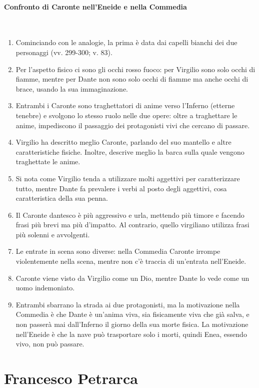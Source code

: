 \documentclass{article}
\begin{document}
\paragraph{Confronto di Caronte nell'Eneide e nella Commedia} \phantom{}\\
\begin{enumerate}
    \item Cominciando con le analogie, la prima è data dai capelli bianchi dei due personaggi (vv. 299-300; v. 83).
    \item Per l'aspetto fisico ci sono gli occhi rosso fuoco: per Virgilio sono solo occhi di fiamme, mentre per Dante non sono solo occhi di fiamme ma anche occhi di brace, usando la sua immaginazione.
    \item Entrambi i Caronte sono traghettatori di anime verso l'Inferno (etterne tenebre) e svolgono lo stesso ruolo nelle due opere: oltre a traghettare le anime, impediscono il passaggio dei protagonisti vivi che cercano di passare.
    \item Virgilio ha descritto meglio Caronte, parlando del suo mantello e altre caratteristiche fisiche. Inoltre, descrive meglio la barca sulla quale vengono traghettate le anime.
    \item Si nota come Virgilio tenda a utilizzare molti aggettivi per caratterizzare tutto, mentre Dante fa prevalere i verbi al posto degli aggettivi, cosa caratteristica della sua penna.
    \item Il Caronte dantesco è più aggressivo e urla, mettendo più timore e facendo frasi più brevi ma più d'impatto. Al contrario, quello virgiliano utilizza frasi più solenni e avvolgenti.
    \item Le entrate in scena sono diverse: nella Commedia Caronte irrompe violentemente nella scena, mentre non c'è traccia di un'entrata nell'Eneide.
    \item Caronte viene visto da Virgilio come un Dio, mentre Dante lo vede come un uomo indemoniato.
    \item Entrambi sbarrano la strada ai due protagonisti, ma la motivazione nella Commedia è che Dante è un'anima viva, sia fisicamente viva che già salva, e non passerà mai dall'Inferno il giorno della sua morte fisica. La motivazione nell'Eneide è che la nave può trasportare solo i morti, quindi Enea, essendo vivo, non può passare.
\end{enumerate}

\newpage
\section{Francesco Petrarca}
\end{document}
